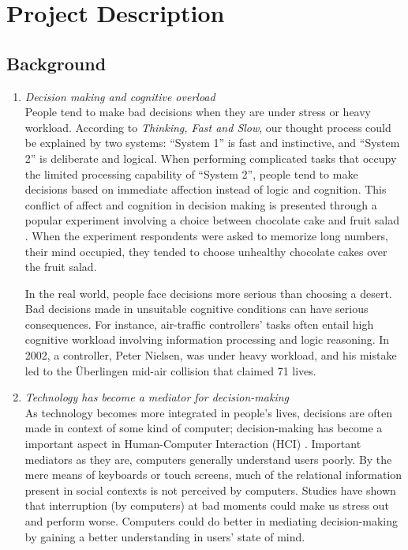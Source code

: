 \documentclass[12pt]{article}
\begin{document}


\section{Project Description}\label{project-description}

\subsection{Background}\label{background}

\begin{enumerate}
\def\labelenumi{\noindent \alph{enumi}.}
\itemsep0pt\parskip0pt
\item{\it Decision making and cognitive overload}\\
  People tend to make bad decisions when they are under stress or heavy workload. 
  According to {\it Thinking, Fast and Slow}, our thought process could be explained by two systems: ``System 1'' is fast and instinctive, and ``System 2'' is deliberate and logical. When performing complicated tasks that occupy the limited processing capability of ``System 2'', people tend to make decisions based on immediate affection instead of logic and cognition. This conflict of affect and cognition in decision making is presented through a popular experiment involving a choice between chocolate cake and fruit salad \parencite{Fedorikhin2014}. When the experiment respondents were asked to memorize long numbers, their mind occupied, they tended to choose unhealthy chocolate cakes over the fruit salad. 


  \hspace{10pt} In the real world, people face decisions more serious than choosing a desert. Bad decisions made in unsuitable cognitive conditions can have serious consequences. For instance, air-traffic controllers' tasks often entail high cognitive workload involving information processing and logic reasoning. In 2002, a controller, Peter Nielsen, was under heavy workload, and his mistake led to the \"{U}berlingen mid-air collision that claimed 71 lives.\\

\item{\it Technology has become a mediator for decision-making}\\
As technology becomes more integrated in people's lives, decisions are often made in context of some kind of computer; decision-making has become a important aspect in Human-Computer Interaction (HCI) \parencite{Zhou2015}.
Important mediators as they are, computers generally understand users poorly. By the mere means of keyboards or touch screens, much of the relational information present in social contexts is not perceived by computers. Studies have shown that interruption (by computers) at bad moments could make us stress out and perform worse\parencite{Carton2009}. 
Computers could do better in mediating decision-making by gaining a better understanding in users' state of mind.\\



\end{enumerate}
\end{document}
